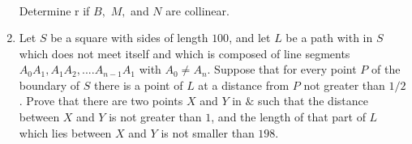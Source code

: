 \documentclass[12pt,-letter paper]{article}
\begin{document}
\begin{enumerate}
\begin{align*}
		    \end{align*}
 Determine r if $B,$ $M,$ and $N$ are collinear.
\item Let $S$ be a square with sides of length $100$, and let $L$ be a path with in $S$ which does not meet itself and which is composed of line segments $A_0A_1, A_1A_2,.... A_{n-1}A_1$ with $A_0 \neq A_n$. Suppose that for every point $P$ of the boundary of $S$ there is a point of $L$ at a distance from $P$ not greater than $1/2$. Prove that there are two points $X$ and $Y$ in  $\&$ such that the distance between $X$ and $Y$ is not greater than $1$, and the length of that part of $L$ which lies between $X$ and $Y$ is not smaller than $198$.
    \end{enumerate}
    
\end{document}
